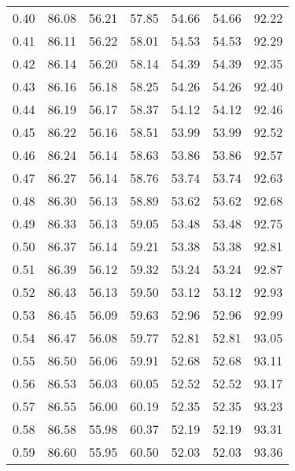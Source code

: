\begin{tabular}{|c|c|c|c|c|c|c|}
      0.40 &     86.08 &     56.21 &      57.85 &   54.66 &      54.66 &         92.22 \\
      0.41 &     86.11 &     56.22 &      58.01 &   54.53 &      54.53 &         92.29 \\
      0.42 &     86.14 &     56.20 &      58.14 &   54.39 &      54.39 &         92.35 \\
      0.43 &     86.16 &     56.18 &      58.25 &   54.26 &      54.26 &         92.40 \\
      0.44 &     86.19 &     56.17 &      58.37 &   54.12 &      54.12 &         92.46 \\
      0.45 &     86.22 &     56.16 &      58.51 &   53.99 &      53.99 &         92.52 \\
      0.46 &     86.24 &     56.14 &      58.63 &   53.86 &      53.86 &         92.57 \\
      0.47 &     86.27 &     56.14 &      58.76 &   53.74 &      53.74 &         92.63 \\
      0.48 &     86.30 &     56.13 &      58.89 &   53.62 &      53.62 &         92.68 \\
      0.49 &     86.33 &     56.13 &      59.05 &   53.48 &      53.48 &         92.75 \\
      0.50 &     86.37 &     56.14 &      59.21 &   53.38 &      53.38 &         92.81 \\
      0.51 &     86.39 &     56.12 &      59.32 &   53.24 &      53.24 &         92.87 \\
      0.52 &     86.43 &     56.13 &      59.50 &   53.12 &      53.12 &         92.93 \\
      0.53 &     86.45 &     56.09 &      59.63 &   52.96 &      52.96 &         92.99 \\
      0.54 &     86.47 &     56.08 &      59.77 &   52.81 &      52.81 &         93.05 \\
      0.55 &     86.50 &     56.06 &      59.91 &   52.68 &      52.68 &         93.11 \\
      0.56 &     86.53 &     56.03 &      60.05 &   52.52 &      52.52 &         93.17 \\
      0.57 &     86.55 &     56.00 &      60.19 &   52.35 &      52.35 &         93.23 \\
      0.58 &     86.58 &     55.98 &      60.37 &   52.19 &      52.19 &         93.31 \\
      0.59 &     86.60 &     55.95 &      60.50 &   52.03 &      52.03 &         93.36 \\

\end{tabular}
